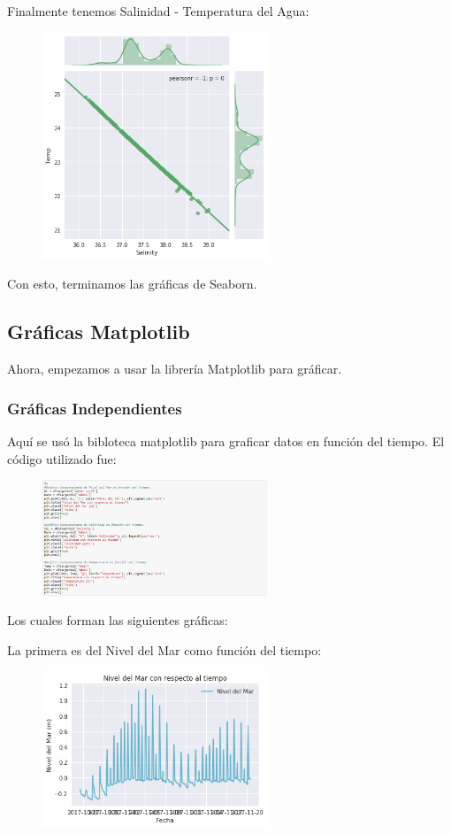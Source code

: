 \documentclass[a4paper]{article}
\begin{document}
\pagebreak
Finalmente tenemos Salinidad - Temperatura del Agua:
\begin{figure}[ht!]
 \centering
  \includegraphics[width=0.6\textwidth]{Pearson3.png}
\end{figure}

Con esto, terminamos las gráficas de Seaborn.

\pagebreak
\subsection{Gráficas Matplotlib}
Ahora, empezamos a usar la librería Matplotlib para gráficar.
\subsubsection{Gráficas Independientes}
Aquí se usó la bibloteca matplotlib para graficar datos en función del tiempo. El código utilizado fue:
\begin{figure}[ht!]
 \centering
  \includegraphics[width=0.6\textwidth]{IndeCodigo.PNG}
\end{figure}
Los cuales forman las siguientes gráficas: 

La primera es del Nivel del Mar como función del tiempo: 
\begin{figure}[ht!]
 \centering
  \includegraphics[width=0.6\textwidth]{Matplotlib1.png}
\end{figure}
\end{document}
